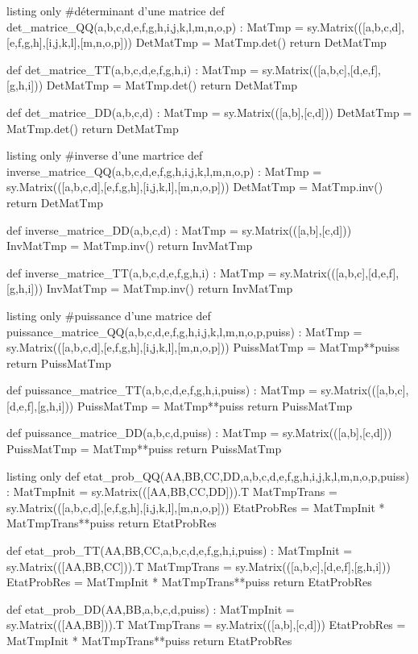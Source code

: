 \documentclass[french,a4paper,11pt]{article}
\begin{document}
\begin{PresentationCodePython}{listing only}
#déterminant d'une matrice
def det_matrice_QQ(a,b,c,d,e,f,g,h,i,j,k,l,m,n,o,p) :
	MatTmp = sy.Matrix(([a,b,c,d],[e,f,g,h],[i,j,k,l],[m,n,o,p]))
	DetMatTmp = MatTmp.det()
	return DetMatTmp

def det_matrice_TT(a,b,c,d,e,f,g,h,i) :
	MatTmp = sy.Matrix(([a,b,c],[d,e,f],[g,h,i]))
	DetMatTmp = MatTmp.det()
	return DetMatTmp

def det_matrice_DD(a,b,c,d) :
	MatTmp = sy.Matrix(([a,b],[c,d]))
	DetMatTmp = MatTmp.det()
	return DetMatTmp
\end{PresentationCodePython}

\begin{PresentationCodePython}{listing only}
#inverse d'une martrice
def inverse_matrice_QQ(a,b,c,d,e,f,g,h,i,j,k,l,m,n,o,p) :
	MatTmp = sy.Matrix(([a,b,c,d],[e,f,g,h],[i,j,k,l],[m,n,o,p]))
	DetMatTmp = MatTmp.inv()
	return DetMatTmp

def inverse_matrice_DD(a,b,c,d) :
	MatTmp = sy.Matrix(([a,b],[c,d]))
	InvMatTmp = MatTmp.inv()
	return InvMatTmp

def inverse_matrice_TT(a,b,c,d,e,f,g,h,i) :
	MatTmp = sy.Matrix(([a,b,c],[d,e,f],[g,h,i]))
	InvMatTmp = MatTmp.inv()
	return InvMatTmp
\end{PresentationCodePython}

\begin{PresentationCodePython}{listing only}
#puissance d'une matrice
def puissance_matrice_QQ(a,b,c,d,e,f,g,h,i,j,k,l,m,n,o,p,puiss) :
	MatTmp = sy.Matrix(([a,b,c,d],[e,f,g,h],[i,j,k,l],[m,n,o,p]))
	PuissMatTmp = MatTmp**puiss
	return PuissMatTmp

def puissance_matrice_TT(a,b,c,d,e,f,g,h,i,puiss) :
	MatTmp = sy.Matrix(([a,b,c],[d,e,f],[g,h,i]))
	PuissMatTmp = MatTmp**puiss
	return PuissMatTmp

def puissance_matrice_DD(a,b,c,d,puiss) :
	MatTmp = sy.Matrix(([a,b],[c,d]))
	PuissMatTmp = MatTmp**puiss
	return PuissMatTmp
\end{PresentationCodePython}

\begin{PresentationCodePython}{listing only}
def etat_prob_QQ(AA,BB,CC,DD,a,b,c,d,e,f,g,h,i,j,k,l,m,n,o,p,puiss) :
	MatTmpInit = sy.Matrix(([AA,BB,CC,DD])).T
	MatTmpTrans = sy.Matrix(([a,b,c,d],[e,f,g,h],[i,j,k,l],[m,n,o,p]))
	EtatProbRes = MatTmpInit * MatTmpTrans**puiss
	return EtatProbRes

def etat_prob_TT(AA,BB,CC,a,b,c,d,e,f,g,h,i,puiss) :
	MatTmpInit = sy.Matrix(([AA,BB,CC])).T
	MatTmpTrans = sy.Matrix(([a,b,c],[d,e,f],[g,h,i]))
	EtatProbRes = MatTmpInit * MatTmpTrans**puiss
	return EtatProbRes

def etat_prob_DD(AA,BB,a,b,c,d,puiss) :
	MatTmpInit = sy.Matrix(([AA,BB])).T
	MatTmpTrans = sy.Matrix(([a,b],[c,d]))
	EtatProbRes = MatTmpInit * MatTmpTrans**puiss
	return EtatProbRes
\end{PresentationCodePython}
\end{document}
